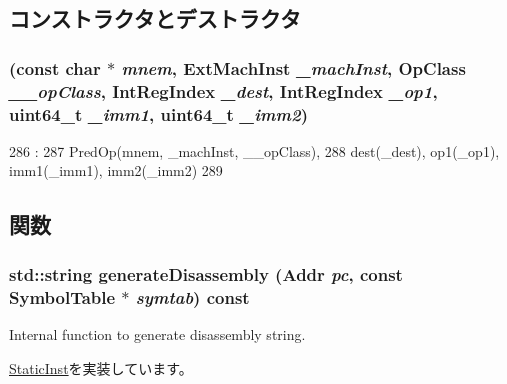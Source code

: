 \subsection{コンストラクタとデストラクタ}
\hypertarget{classRegRegImmImmOp_ae4d369ca0d5dddcf8607fdb94fc6e89c}{
\subsubsection[{RegRegImmImmOp}]{ (const char $\ast$ {\em mnem}, \/  {\bf ExtMachInst} {\em \_\-machInst}, \/  OpClass {\em \_\-\_\-opClass}, \/  {\bf IntRegIndex} {\em \_\-dest}, \/  {\bf IntRegIndex} {\em \_\-op1}, \/  uint64\_\-t {\em \_\-imm1}, \/  uint64\_\-t {\em \_\-imm2})}}
\label{classRegRegImmImmOp_ae4d369ca0d5dddcf8607fdb94fc6e89c}



\begin{DoxyCode}
286                                                    :
287         PredOp(mnem, _machInst, __opClass),
288         dest(_dest), op1(_op1), imm1(_imm1), imm2(_imm2)
289     {}

\end{DoxyCode}


\subsection{関数}
\hypertarget{classRegRegImmImmOp_a95d323a22a5f07e14d6b4c9385a91896}{
\subsubsection[{generateDisassembly}]{\setlength{\rightskip}{0pt plus 5cm}std::string generateDisassembly ({\bf Addr} {\em pc}, \/  const SymbolTable $\ast$ {\em symtab}) const}}
\label{classRegRegImmImmOp_a95d323a22a5f07e14d6b4c9385a91896}
Internal function to generate disassembly string. 

\hyperlink{classStaticInst_ab4a569d2623620c04f8a52bbd91d63b9}{StaticInst}を実装しています。


